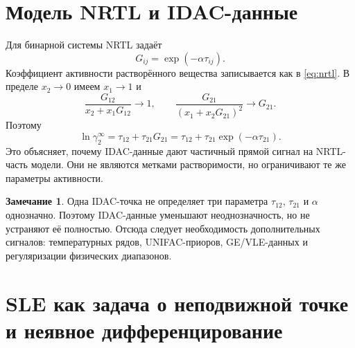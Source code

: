 \documentclass[11pt]{article}
\theoremstyle{definition}
\newtheorem{remark}{Замечание}[section]
\begin{document}
\section{Модель NRTL и IDAC-данные}
\label{app:nrtl}

Для бинарной системы NRTL задаёт~\cite{renon1968}
\begin{equation*}
    G_{ij}=\exp(-\alpha\tau_{ij}).
\end{equation*}
Коэффициент активности растворённого вещества записывается как в \eqref{eq:nrtl}. В пределе $x_2\to0$ имеем $x_1\to1$ и
\begin{equation*}
    \frac{G_{12}}{x_2+x_1G_{12}}\to 1,
    \qquad
    \frac{G_{21}}{(x_1+x_2G_{21})^2}\to G_{21}.
\end{equation*}
Поэтому
\begin{equation*}
    \ln\gamma_2^{\infty}=\tau_{12}+\tau_{21}G_{21}
    =\tau_{12}+\tau_{21}\exp(-\alpha\tau_{21}).
\end{equation*}
Это объясняет, почему IDAC-данные дают частичный прямой сигнал на NRTL-часть модели. Они не являются метками растворимости, но ограничивают те же параметры активности.

\begin{remark}
Одна IDAC-точка не определяет три параметра $\tau_{12}$, $\tau_{21}$ и $\alpha$ однозначно. Поэтому IDAC-данные уменьшают неоднозначность, но не устраняют её полностью. Отсюда следует необходимость дополнительных сигналов: температурных рядов, UNIFAC-приоров, GE/VLE-данных и регуляризации физических диапазонов.
\end{remark}


\section{SLE как задача о неподвижной точке и неявное дифференцирование}
\label{app:implicit}
\end{document}
